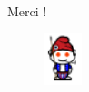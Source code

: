 \documentclass{beamer}
\begin{document}
\begin{frame}
\begin{center}
\Huge Merci !
	\begin{figure}
		\centering
		\includegraphics[width=0.1\textwidth]{reddit_sans_culotte}
	\end{figure}
\end{center}
\end{frame}
\end{document}
